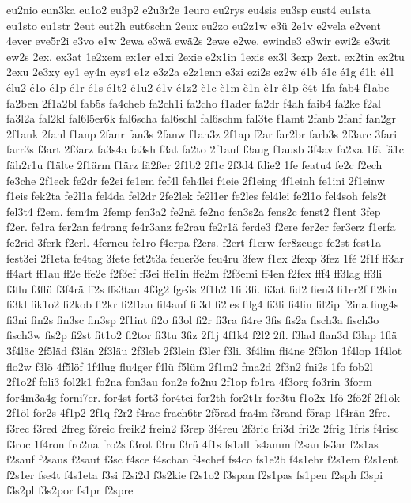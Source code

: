 {eu2nio
eun3ka
eu1o2
eu3p2
e2u3r2e
1euro
eu2rys
eu4sis
eu3sp
eust4
eu1sta
eu1sto
eu1str
2eut
eut2h
eut6schn
2eux
eu2zo
eu2z1w
e3ü
2e1v
e2vela
e2vent
4ever
eve5r2i
e3vo
e1w
2ewa
e3wä
ewä2s
2ewe
e2we.
ewinde3
e3wir
ewi2s
e3wit
ew2s
2ex.
ex3at
1e2xem
ex1er
e1xi
2exie
e2x1in
1exis
ex3l
3exp
2ext.
ex2tin
ex2tu
2exu
2e3xy
ey1
ey4n
eys4
e1z
e3z2a
e2z1enn
e3zi
ezi2s
ez2w
é1b
é1c
é1g
é1h
é1l
élu2
é1o
é1p
é1r
é1s
é1t2
é1u2
é1v
é1z2
è1c
è1m
è1n
è1r
ê1p
ê4t
1fa
fab4
f1abe
fa2ben
2f1a2bl
fab5s
fa4cheb
fa2ch1i
fa2cho
f1ader
fa2dr
f4ah
faib4
fa2ke
f2al
fa3l2a
fal2kl
fal6l5er6k
fal6scha
fal6schl
fal6schm
fal3te
f1amt
2fanb
2fanf
fan2gr
2f1ank
2fanl
f1anp
2fanr
fan3s
2fanw
f1an3z
2f1ap
f2ar
far2br
farb3s
2f3arc
3fari
farr3s
f3art
2f3arz
fa3s4a
fa3sh
f3at
fa2to
2f1auf
f3aug
f1ausb
3f4av
fa2xa
1fä
fä1c
fäh2r1u
f1älte
2f1ärm
f1ärz
fä2ßer
2f1b2
2f1c
2f3d4
fdie2
1fe
featu4
fe2c
f2ech
fe3che
2f1eck
fe2dr
fe2ei
fe1em
fef4l
feh4lei
f4eie
2f1eing
4f1einh
fe1ini
2f1einw
f1eis
fek2ta
fe2l1a
fel4da
fel2dr
2fe2lek
fe2l1er
fe2les
fel4lei
fe2l1o
fel4soh
fels2t
fel3t4
f2em.
fem4m
2femp
fen3a2
fe2nä
fe2no
fen3s2a
fens2c
fenst2
f1ent
3fep
f2er.
fe1ra
fer2an
fe4rang
fe4r3anz
fe2rau
fe2r1ä
ferde3
f2ere
fer2er
fer3erz
f1erfa
fe2rid
3ferk
f2erl.
4ferneu
fe1ro
f4erpa
f2ers.
f2ert
f1erw
fer8zeuge
fe2st
fest1a
fest3ei
2f1eta
fe4tag
3fete
fet2t3a
feuer3e
feu4ru
3few
f1ex
2fexp
3fez
1fé
2f1f
ff3ar
ff4art
ff1au
ff2e
ffe2e
f2f3ef
ff3ei
ffe1in
ffe2m
f2f3emi
ff4en
f2fex
fff4
ff3lag
ff3li
f3flu
f3flü
f3f4rä
ff2s
ffs3tan
4f3g2
fge3s
2f1h2
1fi
3fi.
fi3at
fid2
fien3
fi1er2f
fi2kin
fi3kl
fik1o2
fi2kob
fi2kr
fi2l1an
fil4auf
fil3d
fi2les
filg4
fi3li
fi4lin
fil2ip
f2ina
fing4s
fi3ni
fin2s
fin3sc
fin3sp
2f1int
fi2o
fi3ol
fi2r
fi3ra
fi4re
3fis
fis2a
fisch3a
fisch3o
fisch3w
fis2p
fi2st
fit1o2
fi2tor
fi3tu
3fiz
2f1j
4f1k4
f2l2
2fl.
f3lad
flan3d
f3lap
1flä
3f4läc
2f5läd
f3län
2f3läu
2f3leb
2f3lein
f3ler
f3li.
3f4lim
fli4ne
2f5lon
1f4lop
1f4lot
flo2w
f3lö
4f5löf
1f4lug
flu4ger
f4lü
f5lüm
2f1m2
fma2d
2f3n2
fni2s
1fo
fob2l
2f1o2f
foli3
fol2k1
fo2na
fon3au
fon2e
fo2nu
2f1op
fo1ra
4f3org
fo3rin
3form
for4m3a4g
forni7er.
for4st
fort3
for4tei
for2th
for2t1r
for3tu
f1o2x
1fö
2fö2f
2f1ök
2f1öl
för2s
4f1p2
2f1q
f2r2
f4rac
frach6tr
2f5rad
fra4m
f3rand
f5rap
1f4rän
2fre.
f3rec
f3red
2freg
f3reic
freik2
frein2
f3rep
3f4reu
2f3ric
fri3d
fri2e
2frig
1fris
f4risc
f3roc
1f4ron
fro2na
fro2s
f3rot
f3ru
f3rü
4f1s
fs1all
fs4amm
f2san
fs3ar
f2s1as
f2sauf
f2saus
f2saut
f3sc
f4sce
f4schan
f4schef
fs4co
fs1e2b
f4s1ehr
f2s1em
f2s1ent
f2s1er
fse4t
f4s1eta
f3si
f2si2d
f3s2kie
f2s1o2
f3span
f2s1pas
fs1pen
f2sph
f3spi
f3s2pl
f3s2por
fs1pr
f2spre
}
